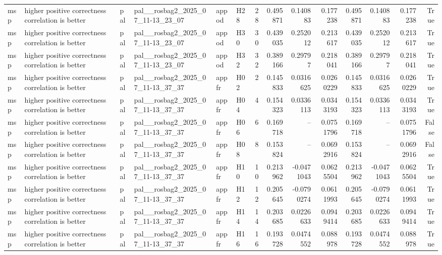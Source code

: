\begin{longtable}{llllllrrrrrrrr}
msp & higher positive correctness correlation is better & pal & pal\_\_rosbag2\_2025\_07\_11-13\_23\_07 & appod & H28 & 28 & 0.495871 & 0.140883 & 0.177238 & 0.495871 & 0.140883 & 0.177238 & True \\
msp & higher positive correctness correlation is better & pal & pal\_\_rosbag2\_2025\_07\_11-13\_23\_07 & appod & H30 & 30 & 0.439035 & 0.252012 & 0.213617 & 0.439035 & 0.252012 & 0.213617 & True \\
msp & higher positive correctness correlation is better & pal & pal\_\_rosbag2\_2025\_07\_11-13\_23\_07 & appod & H32 & 32 & 0.389166 & 0.29797 & 0.218041 & 0.389166 & 0.29797 & 0.218041 & True \\
msp & higher positive correctness correlation is better & pal & pal\_\_rosbag2\_2025\_07\_11-13\_37\_37 & appfr & H02 & 2 & 0.145833 & 0.0316625 & 0.0260229 & 0.145833 & 0.0316625 & 0.0260229 & True \\
msp & higher positive correctness correlation is better & pal & pal\_\_rosbag2\_2025\_07\_11-13\_37\_37 & appfr & H04 & 4 & 0.154323 & 0.0336113 & 0.0343193 & 0.154323 & 0.0336113 & 0.0343193 & True \\
msp & higher positive correctness correlation is better & pal & pal\_\_rosbag2\_2025\_07\_11-13\_37\_37 & appfr & H06 & 6 & 0.169718 & -- & 0.0751796 & 0.169718 & -- & 0.0751796 & False \\
msp & higher positive correctness correlation is better & pal & pal\_\_rosbag2\_2025\_07\_11-13\_37\_37 & appfr & H08 & 8 & 0.153824 & -- & 0.0692916 & 0.153824 & -- & 0.0692916 & False \\
msp & higher positive correctness correlation is better & pal & pal\_\_rosbag2\_2025\_07\_11-13\_37\_37 & appfr & H10 & 10 & 0.213962 & -0.0471043 & 0.0625504 & 0.213962 & -0.0471043 & 0.0625504 & True \\
msp & higher positive correctness correlation is better & pal & pal\_\_rosbag2\_2025\_07\_11-13\_37\_37 & appfr & H12 & 12 & 0.205645 & -0.0790274 & 0.0611993 & 0.205645 & -0.0790274 & 0.0611993 & True \\
msp & higher positive correctness correlation is better & pal & pal\_\_rosbag2\_2025\_07\_11-13\_37\_37 & appfr & H14 & 14 & 0.203685 & 0.0226633 & 0.0949414 & 0.203685 & 0.0226633 & 0.0949414 & True \\
msp & higher positive correctness correlation is better & pal & pal\_\_rosbag2\_2025\_07\_11-13\_37\_37 & appfr & H16 & 16 & 0.193728 & 0.0474552 & 0.088978 & 0.193728 & 0.0474552 & 0.088978 & True \\

\end{longtable}
